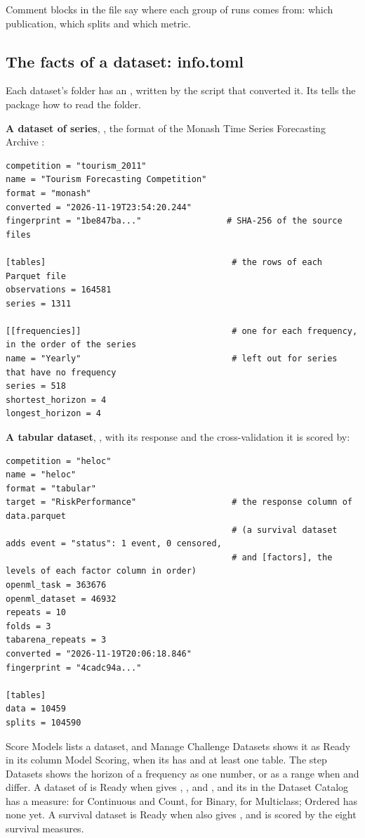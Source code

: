 Comment blocks in the file say where each group of runs comes from: which publication, which splits and which metric.

\subsection{The facts of a dataset: info.toml}

Each dataset's folder has an , written by the script that converted it. Its  tells the
package how to read the folder.

\textbf{A dataset of series}, , the format of the Monash Time Series Forecasting Archive
:

\begin{lstlisting}
competition = "tourism_2011"
name = "Tourism Forecasting Competition"
format = "monash"
converted = "2026-11-19T23:54:20.244"
fingerprint = "1be847ba..."                 # SHA-256 of the source files

[tables]                                     # the rows of each Parquet file
observations = 164581
series = 1311

[[frequencies]]                              # one for each frequency, in the order of the series
name = "Yearly"                              # left out for series that have no frequency
series = 518
shortest_horizon = 4
longest_horizon = 4
\end{lstlisting}

\textbf{A tabular dataset}, , with its response and the cross-validation it is scored by:

\begin{lstlisting}
competition = "heloc"
name = "heloc"
format = "tabular"
target = "RiskPerformance"                   # the response column of data.parquet
                                             # (a survival dataset adds event = "status": 1 event, 0 censored,
                                             # and [factors], the levels of each factor column in order)
openml_task = 363676
openml_dataset = 46932
repeats = 10
folds = 3
tabarena_repeats = 3
converted = "2026-11-19T20:06:18.846"
fingerprint = "4cadc94a..."

[tables]
data = 10459
splits = 104590
\end{lstlisting}

Score Models lists a dataset, and Manage Challenge Datasets shows it as Ready in its column Model Scoring, when its
 has  and at least one \file{[[frequencies]]} table. The step Datasets shows
the horizon of a frequency as one number, or as a range when  and  differ.
A dataset of  is Ready when  gives , , 
and \file{[tables]} , and its  in the Dataset Catalog has a measure:  for
Continuous and Count,  for Binary,  for Multiclass; Ordered has none yet. A survival
dataset is Ready when  also gives , and is scored by the eight survival measures.

